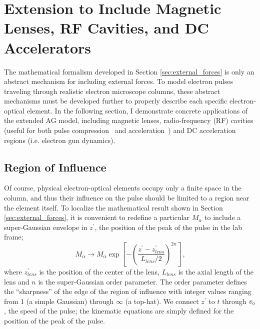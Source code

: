 
\section{Extension to Include Magnetic Lenses, RF Cavities, and DC Accelerators}

The mathematical formalism developed in Section \ref{sec:external_forces} is only an abstract mechanism for including external forces.
To model electron pulses traveling through realistic electron microscope columns, these abstract mechanisms must be developed further to properly describe each specific electron-optical element.
In the following section, I demonstrate concrete applications of the extended AG model, including magnetic lenses, radio-frequency (RF) cavities (useful for both pulse compression~\cite{oudheusden_electron_2007} and acceleration~\cite{kim_rf_1989}) and DC acceleration regions (i.e. electron gun dynamics).

\subsection{Region of Influence}

Of course, physical electron-optical elements occupy only a finite space in the column, and thus their influence on the pulse should be limited to a region near the element itself.
To localize the mathematical result shown in Section \ref{sec:external_forces}, it is convenient to redefine a particular $M_{\alpha}$ to include a super-Gaussian envelope in $z^{\prime}$, the position of the peak of the pulse in the lab frame;
\begin{equation} \label{eq:reg_of_influence}
  M_{\alpha} \to M_{\alpha} \exp \left [ - \left (  \frac{ z^{\prime} - z_{lens}^{\prime} }{ L_{lens} / 2 } \right )^{ 2 n } \right ] \,\text{,}
\end{equation}
where $z_{lens}^{\prime}$ is the position of the center of the lens, $L_{lens}$ is the axial length of the lens and $n$ is the super-Gaussian order parameter.
The order parameter defines the ``sharpness'' of the edge of the region of influence with integer values ranging from 1 (a simple Gaussian) through $\infty$ (a top-hat).
We connect $z^{\prime}$ to $t$ through $ v_{{\scriptscriptstyle 0}} $, the speed of the pulse; the kinematic equations are simply defined for the position of the peak of the pulse.

